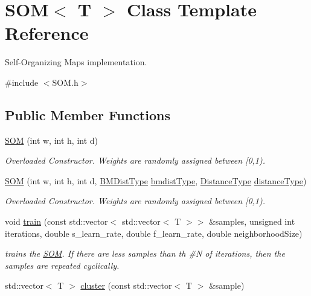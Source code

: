 \hypertarget{class_s_o_m}{}\section{S\+OM$<$ T $>$ Class Template Reference}
\label{class_s_o_m}


Self-\/\+Organizing Maps implementation.  




{\ttfamily \#include $<$S\+O\+M.\+h$>$}

\subsection*{Public Member Functions}
\begin{DoxyCompactItemize}
\item 
\mbox{\hyperlink{class_s_o_m_ae68da19aade22031ef375a4cc6c6cec4}{S\+OM}} (int w, int h, int d)
\begin{DoxyCompactList}\small\item\em Overloaded Constructor. Weights are randomly assigned between \mbox{[}0,1). \end{DoxyCompactList}\item 
\mbox{\hyperlink{class_s_o_m_a980c547746b4458a6dfd9d60703bbf7d}{S\+OM}} (int w, int h, int d, \mbox{\hyperlink{_s_o_m_8h_a55f65662fc7b41a21c646e37b51ae9d9}{B\+M\+Dist\+Type}} \mbox{\hyperlink{class_s_o_m_a8d02f1179ca154170fd3bf349a112706}{bmdist\+Type}}, \mbox{\hyperlink{_s_o_m_8h_a69503914f8053c00b814b3096e784d72}{Distance\+Type}} \mbox{\hyperlink{class_s_o_m_a2cdff72776415d723fba0e90b7df5bc8}{distance\+Type}})
\begin{DoxyCompactList}\small\item\em Overloaded Constructor. Weights are randomly assigned between \mbox{[}0,1). \end{DoxyCompactList}\item 
void \mbox{\hyperlink{class_s_o_m_a9c93f45267b1653317a3ff60df207233}{train}} (const std\+::vector$<$ std\+::vector$<$ T $>$$>$ \&samples, unsigned int iterations, double s\+\_\+learn\+\_\+rate, double f\+\_\+learn\+\_\+rate, double neighborhood\+Size)
\begin{DoxyCompactList}\small\item\em trains the \mbox{\hyperlink{class_s_o_m}{S\+OM}}. If there are less samples than th \#N of iterations, then the samples are repeated cyclically. \end{DoxyCompactList}\item 
std\+::vector$<$ T $>$ \mbox{\hyperlink{class_s_o_m_ae6347cd92d0b112e940808480f718ea2}{cluster}} (const std\+::vector$<$ T $>$ \&sample)
$$
\end{DoxyCompactItemize}
